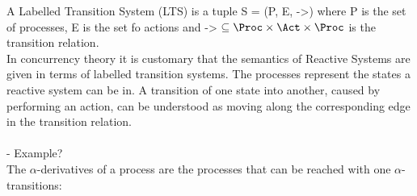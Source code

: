 %
\begin{isabellebody}%
%
%
\isadelimtheory
%
\endisadelimtheory
%
\isatagtheory
%
\endisatagtheory
{\isafoldtheory}%
%
\isadelimtheory
%
\endisadelimtheory
%
\isadelimdocument
%
\endisadelimdocument
%
\isatagdocument
%
\isamarkuptrue%
%
\endisatagdocument
{\isafolddocument}%
%
\isadelimdocument
%
\endisadelimdocument
%
\begin{isamarkuptext}%
A Labelled Transition System (LTS) is a tuple S = (P, E, ->) where P is the set of processes, 
E is the set fo actions and -> $\subseteq \Proc \times \Act \times \Proc$ is the transition relation.\\

In concurrency theory it is customary that the semantics of Reactive Systems are given in terms of labelled transition systems.
The processes represent the states a reactive system can be in. A transition of one state into another, 
caused by performing an action, can be understood as moving along the corresponding edge in the transition relation. \\

\\
- Example?
\\

The $\alpha$-derivatives of a process are the processes that can be reached with one $\alpha$-transitions:


\end{isamarkuptext}
\end{isabellebody}
